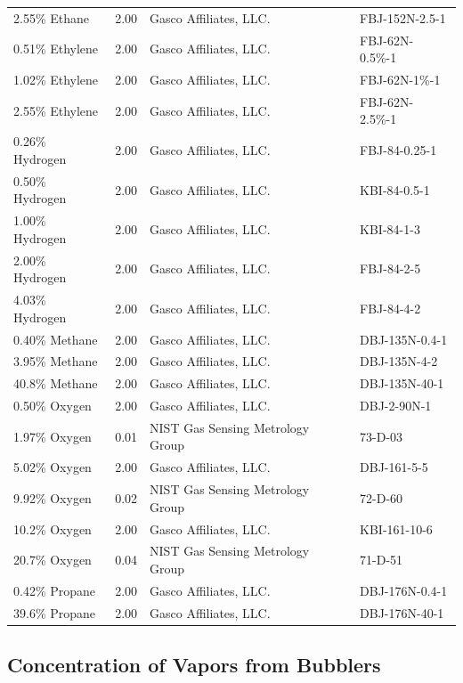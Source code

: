 \documentclass[12pt]{article}
\begin{document}
\begin{table}[h!]
\begin{tabular}{lcll}
2.55\% Ethane		&	2.00	&	Gasco Affiliates, LLC.				&	FBJ-152N-2.5-1		\\
0.51\% Ethylene		&	2.00	&	Gasco Affiliates, LLC.				&	FBJ-62N-0.5\%-1		\\
1.02\% Ethylene		&	2.00	&	Gasco Affiliates, LLC.				&	FBJ-62N-1\%-1		\\
2.55\% Ethylene		&	2.00	&	Gasco Affiliates, LLC.				&	FBJ-62N-2.5\%-1		\\
0.26\% Hydrogen		&	2.00	&	Gasco Affiliates, LLC.				&	FBJ-84-0.25-1		\\
0.50\% Hydrogen		&	2.00	&	Gasco Affiliates, LLC.				&	KBI-84-0.5-1			\\
1.00\% Hydrogen		&	2.00	&	Gasco Affiliates, LLC.				&	KBI-84-1-3			\\
2.00\% Hydrogen		&	2.00	&	Gasco Affiliates, LLC.				&	FBJ-84-2-5			\\
4.03\% Hydrogen		&	2.00	&	Gasco Affiliates, LLC.				&	FBJ-84-4-2			\\
0.40\% Methane		&	2.00	&	Gasco Affiliates, LLC. 				&	DBJ-135N-0.4-1		\\
3.95\% Methane		&	2.00	&	Gasco Affiliates, LLC.				&	DBJ-135N-4-2		\\
40.8\% Methane		&	2.00	&	Gasco Affiliates, LLC.				&	DBJ-135N-40-1		\\
0.50\% Oxygen		&	2.00	&	Gasco Affiliates, LLC. 				&	DBJ-2-90N-1			\\
1.97\% Oxygen		&	0.01	&	NIST Gas Sensing Metrology Group		&	73-D-03			\\
5.02\% Oxygen		&	2.00	&	Gasco Affiliates, LLC.				&	DBJ-161-5-5			\\
9.92\% Oxygen		&	0.02	&	NIST Gas Sensing Metrology Group		&	72-D-60			\\
10.2\% Oxygen		&	2.00	&	Gasco Affiliates, LLC. 				&	KBI-161-10-6		\\
20.7\% Oxygen		&	0.04	&	NIST Gas Sensing Metrology Group		&	71-D-51			\\
0.42\% Propane		&	2.00	&	Gasco Affiliates, LLC.				&	DBJ-176N-0.4-1		\\
39.6\% Propane		&	2.00	&	Gasco Affiliates, LLC. 				&	DBJ-176N-40-1		\\
\hline
\end{tabular}
\end{table}

\pagebreak
\subsection{Concentration of Vapors from Bubblers}
\label{sssec:Concentration of Vapors from Bubblers}
\end{document}
